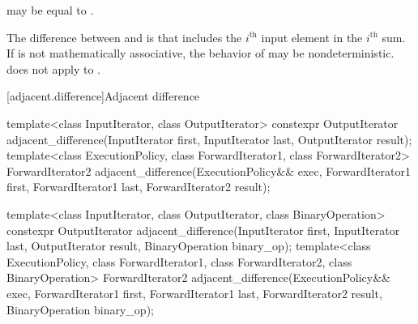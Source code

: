 \begin{itemdescr}
\pnum
\remarks
{} may be equal to .

\pnum
\begin{note}
The difference between  and
 is that 
includes the $i^\text{th}$ input element in the $i^\text{th}$ sum.
If  is not mathematically associative,
the behavior of  may be nondeterministic.
 does not
apply  to .
\end{note}
\end{itemdescr}

[adjacent.difference]{Adjacent difference}

%
\begin{itemdecl}
template<class InputIterator, class OutputIterator>
  constexpr OutputIterator
    adjacent_difference(InputIterator first, InputIterator last,
                        OutputIterator result);
template<class ExecutionPolicy, class ForwardIterator1, class ForwardIterator2>
  ForwardIterator2
    adjacent_difference(ExecutionPolicy&& exec,
                        ForwardIterator1 first, ForwardIterator1 last, ForwardIterator2 result);

template<class InputIterator, class OutputIterator, class BinaryOperation>
  constexpr OutputIterator
    adjacent_difference(InputIterator first, InputIterator last,
                        OutputIterator result, BinaryOperation binary_op);
template<class ExecutionPolicy, class ForwardIterator1, class ForwardIterator2,
         class BinaryOperation>
  ForwardIterator2
    adjacent_difference(ExecutionPolicy&& exec,
                        ForwardIterator1 first, ForwardIterator1 last,
                        ForwardIterator2 result, BinaryOperation binary_op);
\end{itemdecl}

